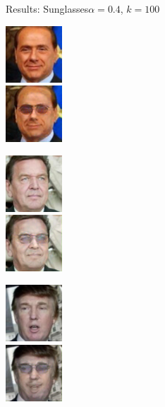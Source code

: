 \documentclass[11pt]{beamer}
\begin{document}
\begin{frame}{Results: Sunglasses}{$\alpha=0.4$, $k=100$}
	\centering
	\begin{minipage}{81px}
		\includegraphics[width=80px]{../pictures/outputs/start-imgs/Berlusconi.png}\\
		\includegraphics[width=80px]{../pictures/outputs/sunglasses_alpha0.4_k100/Berlusconi.png}
	\end{minipage}%
	\begin{minipage}{81px}
		\includegraphics[width=80px]{../pictures/outputs/start-imgs/Schroeder.png}\\
		\includegraphics[width=80px]{../pictures/outputs/sunglasses_alpha0.4_k100/Schroeder.png}
	\end{minipage}%
	\begin{minipage}{81px}
		\includegraphics[width=80px]{../pictures/outputs/start-imgs/Trump.png}\\
		\includegraphics[width=80px]{../pictures/outputs/sunglasses_alpha0.4_k100/Trump.png}

\end{minipage}
\end{frame}
\end{document}
